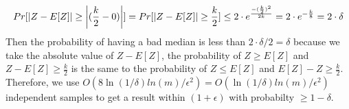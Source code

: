 \documentclass[11pt]{article}%
\begin{document}
\begin{questions}[1]
\begin{enumerate}
    $$Pr[|Z-E[Z]| \geq \left| \bigr. (\frac{k}{2} - 0) \right|] = Pr[|Z-E[Z]| \geq \frac{k}{2}] \leq 2\cdot e^{\frac{-(\frac{k}{2})^2}{2k}} = 2\cdot e^{-\frac{k}{8}} = 2 \cdot \delta$$
    Then the probability of having a bad median is less than $2 \cdot \delta /2 = \delta$ because we take the absolute value of $Z-E[Z]$, the probability of $Z \geq E[Z]$ and $Z - E[Z] \geq \frac{k}{2}$ is the same to the probability of $Z \leq E[Z]$ and $ E[Z] - Z \geq \frac{k}{2}$.\\ Therefore, we use $O(8\ln(1/\delta)ln(m)/\epsilon^2) = O(\ln(1/\delta)ln(m)/\epsilon^2)$ independent samples to get a result within $(1+\epsilon)$ with probabilty $\geq 1-\delta$.
    \end{enumerate}
\end{questions}
\end{document}
